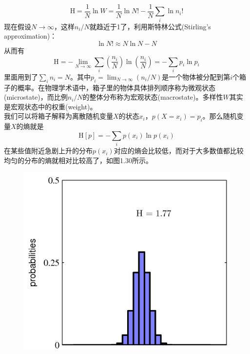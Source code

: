 \documentclass[b5paper]{book}
\numberwithin{equation}{chapter}
\begin{document}
{\begin{equation}
		\mathrm{H} = \frac{1}{N}\ln W = \frac{1}{N} \ln N! - \frac{1}{N}\sum_i \ln n_i !
	\end{equation}
	现在假设$N \rightarrow \infty$，这样$n_i/N$就趋近于1了，利用斯特林公式(Stirling’s approximation)：
	\begin{equation}
		\ln N! \approx N \ln N - N
	\end{equation}
	从而有
	\begin{equation}
		\mathrm{H} = - \lim_{N \rightarrow \infty} \sum_i \left( \frac{n_i}{N} \right) \ln \left( \frac{n_i}{N}\right) = -\sum_i p_i \ln p_i
	\end{equation}
	里面用到了$\sum_i n_i = N$。其中$p_i = \lim_{N \rightarrow \infty} (n_i/N)$是一个物体被分配到第$i$个箱子的概率。在物理学术语中，箱子里的物体具体排列顺序称为微观状态(microstate)，而比例$n_i/N$的整体分布称为宏观状态(macrostate)。多样性$W$其实是宏观状态中的权重(weight)。\\
	\indent 我们可以将箱子解释为离散随机变量$X$的状态$x_i$，$p(X=x_i)=p_i$。那么随机变量$X$的熵就是
	\begin{equation}
		\mathrm{H}[p] = - \sum_i p(x_i)\ln p(x_i)
	\end{equation}
	在某些值附近急剧上升的分布$p(x_i)$对应的熵会比较低，而对于大多数值都比较均匀的分布的熵就相对比较高了，如图1.30所示。
	\begin{figure}[ht]
		\begin{minipage}[t]{0.5\linewidth}
		\includegraphics[scale=0.8]{Images/1-30a.png}
		\label{fig:1-30a}
		\end{minipage}

\end{figure}}
\end{document}
